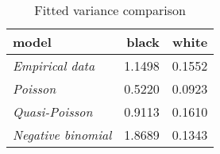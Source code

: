 \begin{wraptable}{r}{2in}

\caption{\label{tab:variance_comparison}Fitted variance comparison}
\centering
\fontsize{9}{11}\selectfont
\begin{tabular}[t]{>{}lrr}
\toprule
model & black & white\\
\midrule
\em{Empirical data} & 1.1498 & 0.1552\\
\em{Poisson} & 0.5220 & 0.0923\\
\em{Quasi-Poisson} & 0.9113 & 0.1610\\
\em{Negative binomial} & 1.8689 & 0.1343\\
\bottomrule
\end{tabular}
\end{wraptable}
